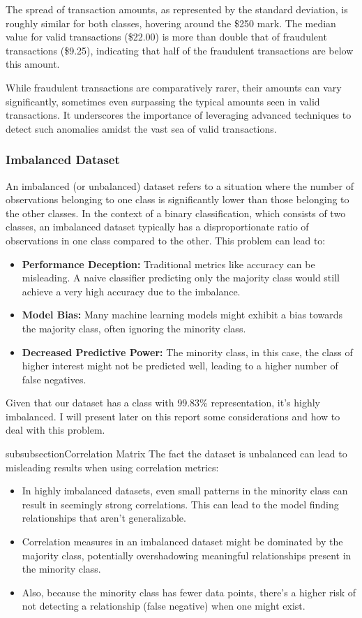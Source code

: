 The spread of transaction amounts, as represented by the standard deviation, is roughly similar for both classes, hovering around the \$250 mark. The median value for valid transactions (\$22.00) is more than double that of fraudulent transactions (\$9.25), indicating that half of the fraudulent transactions are below this amount.

While fraudulent transactions are comparatively rarer, their amounts can vary significantly, sometimes even surpassing the typical amounts seen in valid transactions. It underscores the importance of leveraging advanced techniques to detect such anomalies amidst the vast sea of valid transactions.


\subsubsection{Imbalanced Dataset}

An imbalanced (or unbalanced) dataset refers to a situation where the number of observations belonging to one class is significantly lower than those belonging to the other classes. In the context of a binary classification, which consists of two classes, an imbalanced dataset typically has a disproportionate ratio of observations in one class compared to the other.
This problem can lead to:
\begin{itemize}
    \item \textbf{Performance Deception:} Traditional metrics like accuracy can be misleading. A naive classifier predicting only the majority class would still achieve a very high accuracy due to the imbalance.
    \item \textbf{Model Bias:} Many machine learning models might exhibit a bias towards the majority class, often ignoring the minority class.
    \item \textbf{Decreased Predictive Power:} The minority class, in this case, the class of higher interest might not be predicted well, leading to a higher number of false negatives.
\end{itemize}

Given that our dataset has a class with 99.83\% representation, it's highly imbalanced. I will present later on this report some considerations and how to deal with this problem.

subsubsection{Correlation Matrix}
The fact the dataset is unbalanced can lead to misleading results when using correlation metrics:
\begin{itemize}
    \item In highly imbalanced datasets, even small patterns in the minority class can result in seemingly strong correlations. This can lead to the model finding relationships that aren't generalizable.
    \item Correlation measures in an imbalanced dataset might be dominated by the majority class, potentially overshadowing meaningful relationships present in the minority class.
    \item Also, because the minority class has fewer data points, there's a higher risk of not detecting a relationship (false negative) when one might exist.
\end{itemize}

